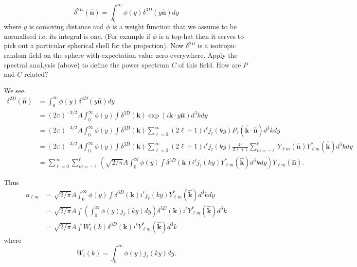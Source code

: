 \documentclass[11pt]{article}
\begin{document}
\begin{equation}
\delta^{2D}(\boldsymbol{\hat{n}}) = \int_0^{\infty} \phi(y) \delta^{3D}(y \boldsymbol{\hat{n}}) dy
\end{equation}
where $y$ is comoving distance and $\phi$ is a weight function that we assume to be normalised i.e. its integral is one. (For example if $\phi$ is a top-hat then it serves to pick out a particular spherical shell for the projection). Now $\delta^{2D}$ is a isotropic random field on the sphere with expectation value zero everywhere. Apply the spectral anaLysis (above) to define the power spectrum $C$ of this field. How are $P$ and $C$ related?

We see
\begin{equation}
\begin{split}
\delta^{2D}(\boldsymbol{\hat{n}}) &= \int_0^{\infty} \phi(y) \delta^{3D}(y \boldsymbol{\hat{n}}) dy \\
&= (2\pi)^{-3/2} A \int_0^{\infty} \phi(y) \int \delta^{3D}(\boldsymbol{k}) \exp(i \boldsymbol{k} \cdot y\boldsymbol{\hat{n}}) d^3k dy \\
&= (2\pi)^{-3/2} A \int_0^{\infty} \phi(y) \int \delta^{3D}(\boldsymbol{k}) \sum_{\ell=0}^\infty (2 \ell +1) i^{\ell} j_{\ell}(ky) P_{\ell}(\boldsymbol{\hat{k}} \cdot \boldsymbol{\hat{n}}) d^3k dy \\
&= (2\pi)^{-3/2} A \int_0^{\infty} \phi(y) \int \delta^{3D}(\boldsymbol{k}) \sum_{\ell=0}^\infty (2 \ell +1) i^{\ell} j_{\ell}(ky) \frac{4 \pi}{2 \ell + 1}\sum_{m=-\ell}^{\ell} Y_{\ell m}(\boldsymbol{\hat{n}}) Y_{\ell m}^{\ast}(\boldsymbol{\hat{k}}) d^3k dy \\
&= \sum_{\ell=0}^\infty \sum_{m=-\ell}^{\ell} \left( \sqrt{2/\pi} A \int_0^{\infty} \phi(y) \int \delta^{3D}(\boldsymbol{k}) i^{\ell} j_{\ell}(ky)  Y_{\ell m}^{\ast}(\boldsymbol{\hat{k}}) d^3k dy \right) Y_{\ell m}(\boldsymbol{\hat{n}}).
\end{split}
\end{equation}

Thus
\begin{equation}
\begin{split}
a_{\ell m} &= \sqrt{2/\pi} A \int_0^{\infty} \phi(y) \int \delta^{3D}(\boldsymbol{k}) i^{\ell} j_{\ell}(ky)  Y_{\ell m}^{\ast}(\boldsymbol{\hat{k}}) d^3k dy \\
&= \sqrt{2/\pi} A \int \left( \int_0^{\infty} \phi(y) j_{\ell}(ky) dy \right) \delta^{3D}(\boldsymbol{k}) i^{\ell}   Y_{\ell m}^{\ast}(\boldsymbol{\hat{k}}) d^3k  \\
&= \sqrt{2/\pi} A \int W_{\ell}(k) \delta^{3D}(\boldsymbol{k}) i^{\ell}   Y_{\ell m}^{\ast}(\boldsymbol{\hat{k}}) d^3k 
\end{split}
\end{equation}
where
\begin{equation}
W_{\ell}(k) = \int_0^{\infty} \phi(y) j_{\ell}(ky) dy.
\end{equation}
\end{document}
